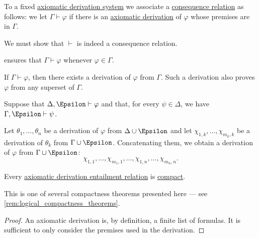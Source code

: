 \begin{definition}\label{def:propositional_axiomatic_derivation_consequence}
  To a fixed \hyperref[def:propositional_axiomatic_derivation_system]{axiomatic derivation system} we associate a \hyperref[def:consequence_relation]{consequence relation} as follows: we let \( \Gamma \vdash \varphi \) if there is an \hyperref[def:propositional_axiomatic_derivation]{axiomatic derivation} of \( \varphi \) whose premises are in \( \Gamma \).
\end{definition}
\begin{defproof}
  We must show that \( {\vdash} \) is indeed a consequence relation.

    ensures that \( \Gamma \vdash \varphi \) whenever \( \varphi \in \Gamma \).

   If \( \Gamma \vdash \varphi \), then there exists a derivation of \( \varphi \) from \( \Gamma \). Such a derivation also proves \( \varphi \) from any superset of \( \Gamma \).

   Suppose that \( \Delta, \Epsilon \vdash \varphi \) and that, for every \( \psi \in \Delta \), we have \( \Gamma, \Epsilon \vdash \psi \).

  Let \( \theta_1, \ldots, \theta_n \) be a derivation of \( \varphi \) from \( \Delta \cup \Epsilon \) and let \( \chi_{1,k}, \ldots, \chi_{m_k,k} \) be a derivation of \( \theta_k \) from \( \Gamma \cup \Epsilon \). Concatenating them, we obtain a derivation of \( \varphi \) from \( \Gamma \cup \Epsilon \):
  \begin{equation*}
    \chi_{1,1}, \ldots, \chi_{m_1,1}, \ldots, \chi_{1,n}, \ldots, \chi_{m_n,n}.
  \end{equation*}
\end{defproof}

\begin{proposition}\label{thm:propositional_axiomatic_derivation_entailment_compact}
  Every \hyperref[def:propositional_axiomatic_derivation_consequence]{axiomatic derivation entailment relation} is \hyperref[def:consequence_relation/compactness]{compact}.
\end{proposition}
\begin{comments}
  \item This is one of several compactness theorems presented here --- see \cref{rem:logical_compactness_theorems}.
\end{comments}
\begin{proof}
  An axiomatic derivation is, by definition, a finite list of formulas. It is sufficient to only consider the premises used in the derivation.
\end{proof}


